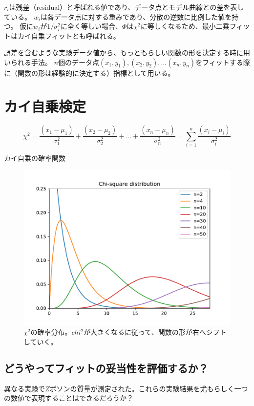 \documentclass[uplatex]{jreport}
\begin{document}
$r_i$は残差（residual）と呼ばれる値であり、データ点とモデル曲線との差を表している。
$w_i$は各データ点に対する重みであり、分散の逆数に比例した値を持つ。
仮に$w_i$が$1/\sigma_i^2$に全く等しい場合、$\Phi$は$\chi^2$に等しくなるため、最小二乗フィットはカイ自乗フィットとも呼ばれる。


誤差を含むような実験データ値から、もっともらしい関数の形を決定する時に用いられる手法。
$n$個のデータ点$(x_1,y_1), (x_2,y_2), ... (x_n, y_n)$をフィットする際に（関数の形は経験的に決定する）指標として用いる。

\section{カイ自乗検定}

\begin{equation}
  \chi^2 = \frac{(x_1-\mu_1)}{\sigma_1^2} + \frac{(x_2-\mu_2)}{\sigma_2^2} + ... + \frac{(x_n-\mu_n)}{\sigma_n^2} = \sum_{i=1}^{n} \frac{(x_i-\mu_i)}{\sigma_i^2}
\end{equation}

カイ自乗の確率関数

\begin{figure}[h]
  \centering
  \includegraphics[scale=0.5]{python/ChiSquareDistribution.pdf}
  \caption{$\chi^2$の確率分布。$chi^2$が大きくなるに従って、関数の形が右へシフトしていく。}
\end{figure}


\subsection{どうやってフィットの妥当性を評価するか？}
異なる実験で$Z$ボソンの質量が測定された。これらの実験結果を尤もらしく一つの数値で表現することはできるだろうか？
\end{document}
